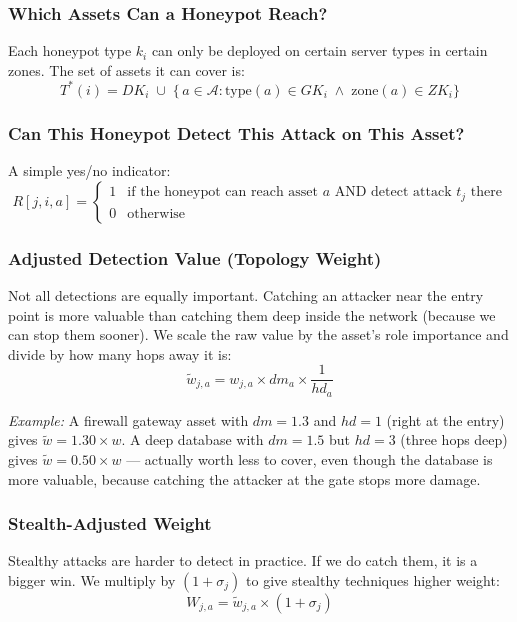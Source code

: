 \documentclass[journal]{IEEEtran}
\newcommand{\tildeW}{\tilde{w}}
\newcommand{\calA}{\mathcal{A}}
\begin{document}
\subsubsection{Which Assets Can a Honeypot Reach?}
Each honeypot type $k_i$ can only be deployed on certain server
types in certain zones. The set of assets it can cover is:
\begin{equation}
  T^*(i) = DK_i \;\cup\;
  \bigl\{\,a \in \calA :
    \mathrm{type}(a) \in GK_i \;\wedge\; \mathrm{zone}(a) \in ZK_i
  \bigr\}
\end{equation}

\subsubsection{Can This Honeypot Detect This Attack on This Asset?}
A simple yes/no indicator:
\begin{equation}
  R[j,i,a] =
  \begin{cases}
    1 & \text{if the honeypot can reach asset $a$ AND detect attack $t_j$ there} \\
    0 & \text{otherwise}
  \end{cases}
\end{equation}

\subsubsection{Adjusted Detection Value (Topology Weight)}
Not all detections are equally important. Catching an attacker
near the entry point is more valuable than catching them deep
inside the network (because we can stop them sooner). We scale
the raw value by the asset's role importance and divide by how
many hops away it is:
\begin{equation}
  \tildeW_{j,a} = w_{j,a} \times dm_a \times \frac{1}{hd_a}
\end{equation}

\textit{Example:} A firewall gateway asset with $dm=1.3$ and
$hd=1$ (right at the entry) gives $\tildeW = 1.30 \times w$.
A deep database with $dm=1.5$ but $hd=3$ (three hops deep)
gives $\tildeW = 0.50 \times w$ --- actually worth less to cover,
even though the database is more valuable, because catching the
attacker at the gate stops more damage.

\subsubsection{Stealth-Adjusted Weight}
Stealthy attacks are harder to detect in practice. If we do catch
them, it is a bigger win. We multiply by $(1 + \sigma_j)$ to give
stealthy techniques higher weight:
\begin{equation}
  W_{j,a} = \tildeW_{j,a} \times (1 + \sigma_j)
\end{equation}
\end{document}
